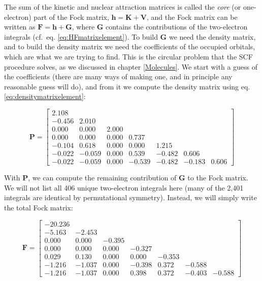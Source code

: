 \documentclass[
  english,
  9pt,
]{extbook}
\theoremstyle{definition}
\theoremstyle{definition}
\theoremstyle{definition}
\theoremstyle{definition}
\theoremstyle{remark}
\begin{document}
The sum of the kinetic and nuclear attraction matrices is called the \emph{core} (or one-electron) part of the Fock matrix, \(\mathbf{h} = \mathbf{K} + \mathbf{V}\), and the Fock matrix can be written as \(\mathbf{F} = \mathbf{h} + \mathbf{G}\), where \(\mathbf{G}\) contains the contributions of the two-electron integrals (cf.~eq. \eqref{eq:HFmatrixelement}). To build \(\mathbf{G}\) we need the density matrix, and to build the density matrix we need the coefficients of the occupied orbitals, which are what we are trying to find. This is the circular problem that the SCF procedure solves, as we discussed in chapter \ref{Molecules}. We start with a guess of the coefficients (there are many ways of making one, and in principle any reasonable guess will do), and from it we compute the density matrix using eq. \eqref{eq:densitymatrixelement}:

\begin{equation}
\mathbf{P}=
\begin{bmatrix}
2.108 & & & & & & \\
-0.456 & 2.010 & & & & &  \\
0.000 & 0.000 & 2.000 & & & & \\
0.000 & 0.000 & 0.000 & 0.737 & & & \\
-0.104 & 0.618 & 0.000 & 0.000 & 1.215 & & \\
-0.022 & -0.059 & 0.000 & 0.539 & -0.482 & 0.606 & \\
-0.022 & -0.059 & 0.000 & -0.539 & -0.482 & -0.183 & 0.606
\end{bmatrix}
\label{eq:pmatrix}
\end{equation}

With \(\mathbf{P}\), we can compute the remaining contribution of \(\mathbf{G}\) to the Fock matrix. We will not list all 406 unique two-electron integrals here (many of the 2,401 integrals are identical by permutational symmetry). Instead, we will simply write the total Fock matrix:

\begin{equation}
\mathbf{F}=
\begin{bmatrix}
-20.236 & & & & & & \\ 
-5.163 & -2.453 & & & & &  \\
0.000 & 0.000 & -0.395 & & & & \\
0.000 & 0.000 & 0.000 & -0.327 & & & \\
0.029 & 0.130 & 0.000 & 0.000 & -0.353 & & \\
-1.216 & -1.037 & 0.000 & -0.398 & 0.372 & -0.588 & \\
-1.216 & -1.037 & 0.000 & 0.398 & 0.372 & -0.403 & -0.588
\end{bmatrix}
\label{eq:fmatrix}
\end{equation}
\end{document}
